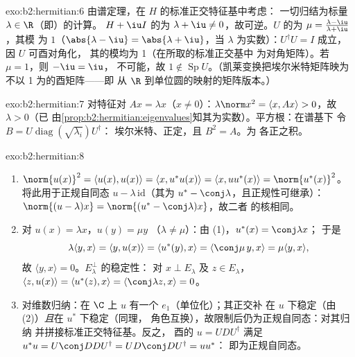 \begin{solution}{exo:b2:hermitian:6}
由谱定理，在 $H$ 的标准正交特征基中考虑：
一切归结为标量 $\lambda \in \R$（即）的计算。
$H + \iu I$ 的为 $\lambda + \iu \neq 0$，故可逆。$U$
的为 $\mu = \frac{\lambda - \iu}{\lambda + \iu}$，其模
为 $1$（$\abs{\lambda - \iu} = \abs{\lambda + \iu}$，当
$\lambda$ 为实数）：$U^\dagger U = I$ 成立，因 $U$ 可酉对角化，
其的模均为 1（在所取的标准正交基中
为对角矩阵）。若 $\mu = 1$，则 $-\iu = \iu$，
不可能，故 $1 \notin \operatorname{Sp} U$。（凯莱变换把埃尔米特矩阵映为
不以 1 为的酉矩阵——即
从 $\R$ 到单位圆的映射的矩阵版本。）
\end{solution}

\begin{solution}{exo:b2:hermitian:7}
对特征对 $Ax = \lambda x$（$x \neq 0$）：$\lambda\norm x^2 =
\langle x, Ax\rangle > 0$，故 $\lambda > 0$（已
由\cref{prop:b2:hermitian:eigenvalues}知其为实数）。平方根：在谱基下
令 $B = U\operatorname{diag}(\sqrt{\lambda_i})U^\dagger$：
埃尔米特、正定，且 $B^2 = A$。为
各正之积。
\end{solution}

\begin{solution}{exo:b2:hermitian:8}
\begin{enumerate}
  \item $\norm{u(x)}^2 = \langle u(x), u(x)\rangle = \langle x,
        u^*u(x)\rangle = \langle x, uu^*(x)\rangle =
        \norm{u^*(x)}^2$。将此用于正规自同态 $u -
        \lambda\,\mathrm{id}$（其为 $u^* -
        \conj\lambda$，且正规性可继承）：$\norm{(u -
        \lambda)x} = \norm{(u^* - \conj\lambda)x}$，故二者
        的核相同。
  \item 对 $u(x) = \lambda x$，$u(y) = \mu y$
        （$\lambda \neq \mu$）：由 (1)，$u^*(x) = \conj\lambda x$；
        于是
        \[
        \lambda\langle y, x\rangle = \langle y, u(x)\rangle
        = \langle u^*(y), x\rangle = \langle \conj\mu\, y, x\rangle
        = \mu \langle y, x\rangle ,
        \]
        故 $\langle y, x\rangle = 0$。$E_\lambda^\perp$ 的稳定性：
        对 $x \perp E_\lambda$ 及 $z \in E_\lambda$，$\langle z,
        u(x)\rangle = \langle u^*(z), x\rangle =
        \langle\conj\lambda z, x\rangle = 0$。
  \item 对维数归纳：在 $\C$ 上 $u$ 有一个
        $e_1$（单位化）；其正交补
        在 $u$ 下稳定（由 (2)）\emph{且}在 $u^*$ 下稳定（同理，
        角色互换），故限制后仍为正规自同态：对其归纳
        并拼接标准正交特征基。反之，
        酉的 $u = UDU^\dagger$ 满足 $u^*u
        = U\conj D D U^\dagger = U D\conj D U^\dagger = uu^*$：
        即为正规自同态。
\end{enumerate}
\end{solution}

